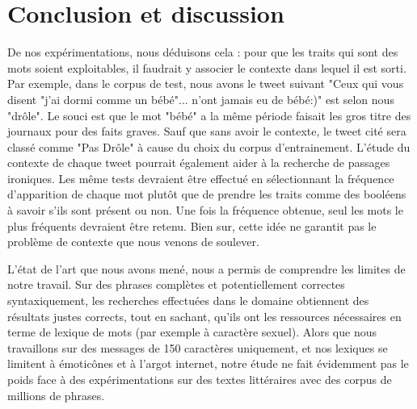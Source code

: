 \documentclass[10pt,a4paper,twoside]{article}
\begin{document}
%



\section{Conclusion et discussion}

De nos expérimentations, nous déduisons cela : pour que les traits qui sont des mots soient exploitables, il faudrait y associer le contexte dans lequel il est sorti. Par exemple, dans le corpus de test, nous avons le tweet suivant "Ceux qui vous disent "j'ai dormi comme un bébé"... n'ont jamais eu de bébé:)" est selon nous "drôle". Le souci est que le mot "bébé" a la même période faisait les gros titre des journaux pour des faits graves. Sauf que sans avoir le contexte, le tweet cité sera classé comme "Pas Drôle" à cause du choix du corpus d'entrainement. L'étude du contexte de chaque tweet pourrait également aider à la recherche de passages ironiques. 
Les même tests devraient être effectué en sélectionnant la fréquence d'apparition de chaque mot plutôt que de prendre les traits comme des booléens à savoir s'ils sont présent ou non. Une fois la fréquence obtenue, seul les mots le plus fréquents devraient être retenu. Bien sur, cette idée ne garantit pas le problème de contexte que nous venons de soulever.

L'état de l'art que nous avons mené, nous a permis de comprendre les limites de notre travail. Sur des phrases complètes et potentiellement correctes syntaxiquement, les recherches effectuées dans le domaine obtiennent des résultats justes corrects, tout en sachant, qu'ils ont les ressources nécessaires en terme de lexique de mots (par exemple à caractère sexuel). Alors que nous travaillons sur des messages de 150 caractères uniquement, et nos lexiques se limitent à émoticônes et à l'argot internet, notre étude ne fait évidemment pas le poids face à des expérimentations sur des textes littéraires avec des corpus de millions de phrases. 




\nocite{Kiddon11,MihalceaP07}

\end{document}

